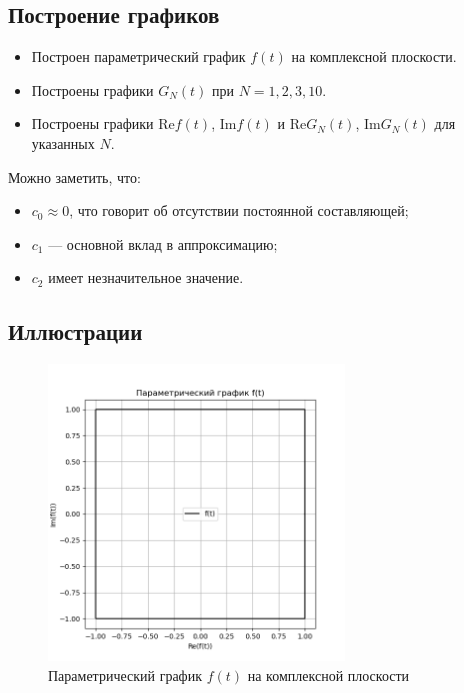 \subsection*{Построение графиков}

\begin{itemize}
    \item Построен параметрический график $f(t)$ на комплексной плоскости.
    \item Построены графики $G_N(t)$ при $N = 1, 2, 3, 10$.
    \item Построены графики $\text{Re} f(t)$, $\text{Im} f(t)$ и $\text{Re} G_N(t)$, $\text{Im} G_N(t)$ для указанных $N$.
\end{itemize}

Можно заметить, что:
\begin{itemize}
    \item $c_0 \approx 0$, что говорит об отсутствии постоянной составляющей;
    \item $c_1$ — основной вклад в аппроксимацию;
    \item $c_2$ имеет незначительное значение.
\end{itemize}

\subsection*{Иллюстрации}

\begin{figure}[H]
    \centering
    \includegraphics[width=0.7\textwidth]{parametric_plot.png}
    \caption{Параметрический график $f(t)$ на комплексной плоскости}
\end{figure}


